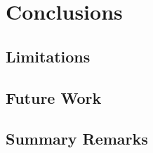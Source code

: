 \chapter{Conclusions}
\label{Chapter:Conclusions}

\section{Limitations}

\section{Future Work}

\section{Summary Remarks}